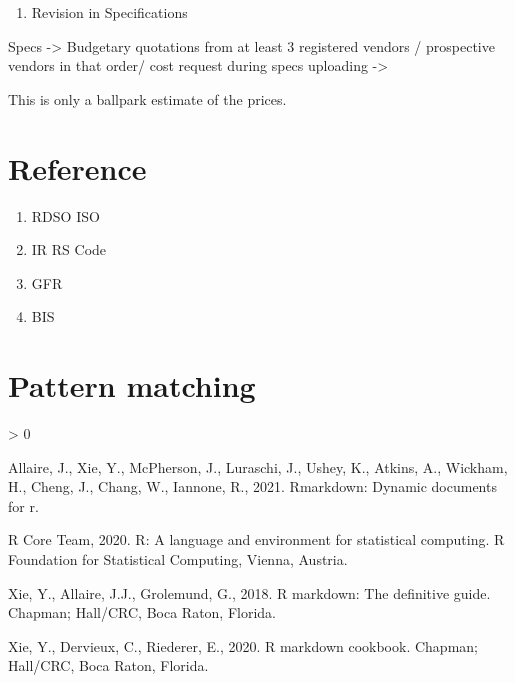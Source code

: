 \documentclass[
  10pt,
  twoside]{article}
\providecommand{\tightlist}{%
  \setlength{\itemsep}{0pt}\setlength{\parskip}{0pt}}
\newlength{\cslhangindent}
\newenvironment{CSLReferences}[2] %
 {%
  \setlength{\parindent}{0pt}
  \ifodd #1 \everypar{\setlength{\hangindent}{\cslhangindent}}\ignorespaces\fi
  \ifnum #2 > 0
  \setlength{\parskip}{#2\baselineskip}
  \fi
 }%
 {}
\begin{document}
\begin{enumerate}
\def\labelenumi{\arabic{enumi}.}
\setcounter{enumi}{1}
\tightlist
\item
  Revision in Specifications
\end{enumerate}

Specs -\textgreater{} Budgetary quotations from at least 3 registered
vendors / prospective vendors in that order/ cost request during specs
uploading -\textgreater{}

This is only a ballpark estimate of the prices.

\hypertarget{reference}{%
\section{Reference}\label{reference}}

\begin{enumerate}
\def\labelenumi{\arabic{enumi}.}
\tightlist
\item
  RDSO ISO
\item
  IR RS Code
\item
  GFR
\item
  BIS
\end{enumerate}

\hypertarget{pattern-matching}{%
\section{Pattern matching}\label{pattern-matching}}



\hypertarget{refs}{}
\begin{CSLReferences}{1}{0}
\leavevmode\hypertarget{ref-R-rmarkdown}{}%
Allaire, J., Xie, Y., McPherson, J., Luraschi, J., Ushey, K., Atkins,
A., Wickham, H., Cheng, J., Chang, W., Iannone, R., 2021. Rmarkdown:
Dynamic documents for r.

\leavevmode\hypertarget{ref-R-base}{}%
R Core Team, 2020. R: A language and environment for statistical
computing. R Foundation for Statistical Computing, Vienna, Austria.

\leavevmode\hypertarget{ref-rmarkdown2018}{}%
Xie, Y., Allaire, J.J., Grolemund, G., 2018. R markdown: The definitive
guide. Chapman; Hall/CRC, Boca Raton, Florida.

\leavevmode\hypertarget{ref-rmarkdown2020}{}%
Xie, Y., Dervieux, C., Riederer, E., 2020. R markdown cookbook. Chapman;
Hall/CRC, Boca Raton, Florida.

\end{CSLReferences}
\end{document}
